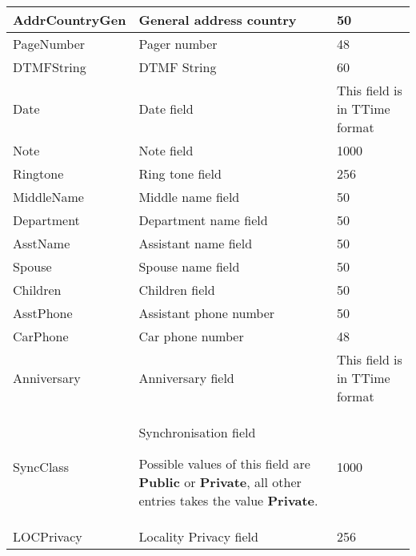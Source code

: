 \begin{table}[htbp]
\begin{center}
\begin{tabular}{l|l|l}
\hline
AddrCountryGen & General address country & 50  \\
\hline
PageNumber & Pager number & 48  \\
\hline
DTMFString & DTMF String & 60  \\
\hline
Date & Date field & This field is in TTime format  \\
\hline
Note & Note field & 1000  \\
\hline
Ringtone & Ring tone field & 256  \\
\hline
{\color{blue}MiddleName} & {\color{blue}Middle name field} & 50  \\
\hline
{\color{blue}Department} & {\color{blue}Department name field} & 50  \\
\hline
{\color{blue}AsstName} & {\color{blue}Assistant name field} & 50  \\
\hline
{\color{blue}Spouse} & {\color{blue}Spouse name field} & 50  \\
\hline
{\color{blue}Children} & {\color{blue}Children field} & 50  \\
\hline
{\color{blue}AsstPhone} & {\color{blue}Assistant phone number} & 50 \\
\hline
{\color{blue}CarPhone} & {\color{blue}Car phone number} & 48  \\
\hline
{\color{blue}Anniversary} & {\color{blue}Anniversary field} & This field is in TTime format  \\
\hline
{\color{blue}SyncClass} & {\color{blue}Synchronisation field} \break

{\color{blue}Possible values of this field are {\bf Public} or {\bf Private}, all other entries takes the value {\bf Private}.} & 1000  \\
\hline
LOCPrivacy & Locality Privacy field & 256  \\
\end{tabular}
\end{center}
\end{table}
\pagebreak

